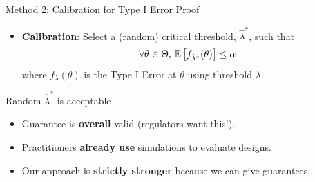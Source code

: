 \begin{frame}{Method 2: Calibration for Type I Error Proof}
\begin{itemize}
    \item \textbf{Calibration}: 
        Select a (random) critical threshold, $\hat{\lambda}^*$, such that 
        \begin{align*}
        \forall \theta \in \Theta,\, 
        \mathbb{E}\left[f_{\hat{\lambda}^*}(\theta)\right] 
        \leq 
        \alpha
        \end{align*}
        where $f_{\lambda}(\theta)$ is the Type I Error at $\theta$
        using threshold $\lambda$.
\end{itemize} 
\end{frame}

\begin{frame}{Random $\hat{\lambda}^*$ is acceptable}
\begin{itemize}
    \item Guarantee is \textbf{overall} valid (regulators want this!).
    \item Practitioners \textbf{already use} simulations to evaluate designs.
    \item Our approach is \textbf{strictly stronger} because we can give guarantees.
\end{itemize}
\end{frame}